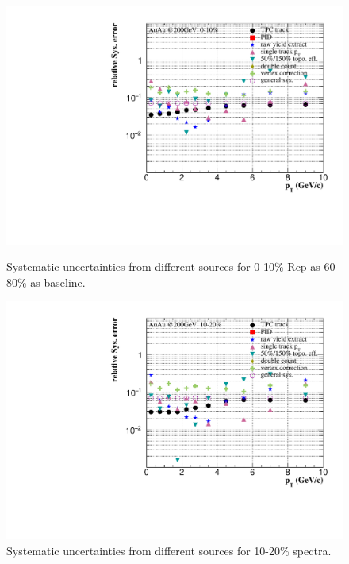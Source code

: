 \begin{figure}[htbp]
\begin{minipage}[htbp]{0.47\linewidth}
\centering
\includegraphics[width=1.0\textwidth,angle=0]{figure/Run14_D0HFT/sysErr_0_10_Rcp1.pdf}
\caption{ Systematic uncertainties from different sources for 0-10\% Rcp as 60-80\% as baseline. \label{sysErr_0_10_Rcp1}}
\end{minipage}
\hfill
\begin{minipage}[htbp]{0.47\linewidth}
\centering
\includegraphics[width=1.0\textwidth,angle=0]{figure/Run14_D0HFT/sysErr_10_20_Rcp1.pdf} 
\caption{ Systematic uncertainties from different sources for 10-20\% spectra. \label{sysErr_10_20_Rcp1}}
\end{minipage}
\end{figure}

